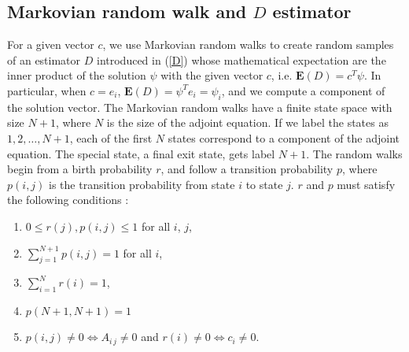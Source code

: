 \documentclass[a4paper,11pt]{article}
\theoremstyle{remark}
\theoremstyle{definition}
\begin{document}
    \subsection{Markovian random walk and $D$ estimator}
        For a given vector $c$, we use Markovian random walks to create
        random samples of an estimator $D$ introduced in (\ref{D}) whose
        mathematical expectation are the inner product of the solution
        $\psi$ with the given vector $c$, i.e. $\mathbf{E}(D) = c^T \psi$.
        In particular, when $c=e_i$, $\mathbf{E}(D) = \psi^T e_i = \psi_i$,
        and we compute a component of the solution vector. The Markovian
        random walks have a finite state space with size $N+1$, where $N$ is
        the size of the adjoint equation. If we label the states as
        $1,2,\ldots,N+1$, each of the first $N$ states correspond to a
        component of the adjoint equation. The special state, a final exit
        state, gets label $N+1$. The random walks begin from a birth
        probability $r$, and follow a transition probability $p$, where
        $p(i,j)$ is the transition probability from state $i$ to state $j$.
        $r$ and $p$ must satisfy the following conditions \cite{Okten2005}:
        \begin{enumerate}
        \item $0\le r(j), p(i,j)\le 1$ for all $i$, $j$, \vspace{-4mm}
              \begin{equation}\label{cond1}\end{equation}
        \item $\sum_{j=1}^{N+1} p(i,j) = 1$ for all $i$, \vspace{-4mm}
              \begin{equation}\label{cond2}\end{equation}
        \item $\sum_{i=1}^N r(i) = 1$, \vspace{-4mm}
              \begin{equation}\label{cond3}\end{equation}
        \item $p(N+1,N+1) = 1$ \vspace{-4mm}
              \begin{equation}\label{cond3_5}\end{equation}
        \item $p(i,j) \ne 0 \Longleftrightarrow A_{i\,j} \ne 0$
              and $r(i) \ne 0 \Longleftrightarrow c_i \ne 0$. \vspace{-4mm}
              \begin{equation}\label{cond4}\end{equation}
        \end{enumerate}
\end{document}

